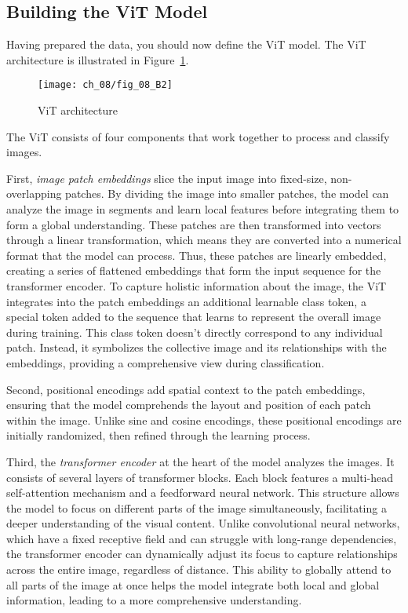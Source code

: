 \subsection{Building the ViT Model}

Having prepared the data, you should now define the ViT model. The ViT architecture is illustrated in Figure~\ref{fig:08:B:ViT}.

\begin{figure}[H]
    \texttt{[image: ch\_08/fig\_08\_B2]} %
    \caption{ViT architecture}
    \label{fig:08:B:ViT}
\end{figure}

The ViT consists of four components that work together to process and classify images.

First, \emph{image patch embeddings} slice the input image into fixed-size, non-overlapping patches. By dividing the image into smaller patches, the model can analyze the image in segments and learn local features before integrating them to form a global understanding. 
These patches are then transformed into vectors through a linear transformation, which means they are converted into a numerical format that the model can process.
Thus, these patches are linearly embedded, creating a series of flattened embeddings that form the input sequence for the transformer encoder. 
To capture holistic information about the image, the ViT integrates into the patch embeddings an additional learnable class token, a special token added to the sequence that learns to represent the overall image during training. This class token doesn't directly correspond to any individual patch. Instead, it symbolizes the collective image and its relationships with the embeddings, providing a comprehensive view during classification.

Second, positional encodings add spatial context to the patch embeddings, ensuring that the model comprehends the layout and position of each patch within the image. Unlike sine and cosine encodings, these positional encodings are initially randomized, then refined through the learning process.

Third, the \emph{transformer encoder} at the heart of the model analyzes the images. It consists of several layers of transformer blocks. Each block features a multi-head self-attention mechanism and a feedforward neural network. This structure allows the model to focus on different parts of the image simultaneously, facilitating a deeper understanding of the visual content.
Unlike convolutional neural networks, which have a fixed receptive field and can struggle with long-range dependencies, the transformer encoder can dynamically adjust its focus to capture relationships across the entire image, regardless of distance. This ability to globally attend to all parts of the image at once helps the model integrate both local and global information, leading to a more comprehensive understanding.

